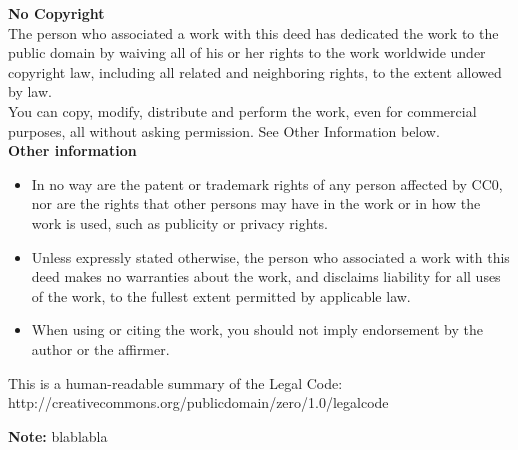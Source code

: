 \begin{center}
\begin{minipage}{0.8 \textwidth}
\vspace{3cm}%
\textbf{No Copyright}\\

The person who associated a work with this deed has dedicated the work to the public domain by waiving all of his or her rights to the work worldwide under copyright law, including all related and neighboring rights, to the extent allowed by law.\\

You can copy, modify, distribute and perform the work, even for commercial purposes, all without asking permission. See Other Information below.\\

\textbf{Other information}\\

\begin{itemize}

\item In no way are the patent or trademark rights of any person affected by CC0, nor are the rights that other persons may have in the work or in how the work is used, such as publicity or privacy rights.
\item Unless expressly stated otherwise, the person who associated a work with this deed makes no warranties about the work, and disclaims liability for all uses of the work, to the fullest extent permitted by applicable law.

\item When using or citing the work, you should not imply endorsement by the author or the affirmer.
\end{itemize}
\vspace{1cm}
\begin{center}
This is a human-readable summary of the Legal Code: http://creativecommons.org/publicdomain/zero/1.0/legalcode
\end{center}
\end{minipage}
\end{center}
\vspace{0.2cm}
\textbf{Note: }blablabla

\pagebreak